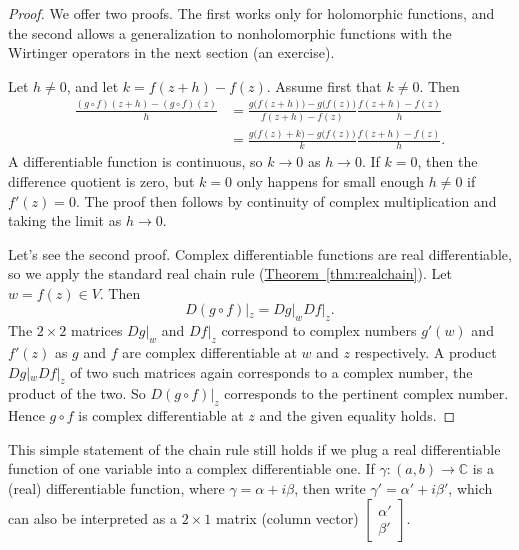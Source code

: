 \documentclass[12pt,openany]{book}
\newcommand{\C}{{\mathbb{C}}}
\theoremstyle{plain}
\theoremstyle{remark}
\theoremstyle{definition}
\theoremstyle{exercise}
\theoremstyle{example}
\newcommand{\thmref}[1]{\hyperref[#1]{Theorem~\ref*{#1}}}
\begin{document}
\begin{proof}
We offer two proofs.  The first works only for holomorphic
functions, and the second allows a generalization to nonholomorphic functions
with the Wirtinger operators in the next section (an exercise).

Let $h \not= 0$, and let $k = f(z+h) -f(z)$.
Assume first that $k\not=0$.
Then
\begin{equation*}
\begin{split}
\frac{(g \circ f)(z+h) - (g \circ f)(z)}{h}
& =
\frac{g \bigl( f(z+h) \bigr) - g\bigl( f(z) \bigr)}{f(z+h)-f(z)}
\frac{f(z+h)-f(z)}{h}
\\
& =
\frac{g \bigl( f(z) + k \bigr) - g\bigl( f(z) \bigr)}{k}
\frac{f(z+h)-f(z)}{h} .
\end{split}
\end{equation*}
A differentiable function is continuous, so $k \to 0$ as $h \to 0$.
If $k=0$, then the difference quotient is zero, but $k=0$
only happens for small enough $h\not=0$ if $f'(z)=0$.
The proof then follows by continuity of complex multiplication and taking
the limit as $h \to 0$.

Let's see the second proof.
Complex differentiable functions are real differentiable, so
we apply the standard real chain rule (\thmref{thm:realchain}).
Let $w = f(z) \in V$.  Then
\begin{equation*}
D(g \circ f)|_z = Dg|_w Df|_z .
\end{equation*}
The $2 \times 2$ matrices $Dg|_w$ and $Df|_z$ correspond to complex
numbers $g'(w)$ and $f'(z)$ as $g$ and $f$ are complex differentiable at $w$ and $z$
respectively.
A product $Dg|_w Df|_z$
of two such matrices again corresponds to a complex number, the product of
the two.
So $D(g \circ f)|_z$ corresponds to the pertinent complex number.
Hence $g \circ f$ is complex differentiable at $z$ and the given equality holds.
\end{proof}

This simple statement of the chain rule still holds
if we plug a real differentiable function of one variable
into a complex differentiable
one.  If $\gamma \colon (a,b)
\to \C$ is a (real) differentiable function, where
$\gamma = \alpha + i \beta$,
then write $\gamma' = \alpha' + i \beta'$, which can also be interpreted
as a $2 \times 1$ matrix (column vector)
$\left[\begin{smallmatrix}\alpha'\\\beta'\end{smallmatrix}\right]$.
\end{document}
